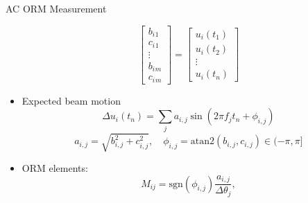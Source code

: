 \documentclass[aspectratio=169]{beamer}
\begin{document}
\begin{frame}{AC ORM Measurement}
\begin{minipage}{0.55\textwidth}
\begin{itemize}
\begin{equation*}
\begin{bmatrix}
                            b_{i}{}_{1}\\
                            c_{i}{}_{1}\\
                            \vdots \\
                            b_{i}{}_{m}\\
                            c_{i}{}_{m}
                        \end{bmatrix} =\begin{bmatrix}
                            u_{i}( t_{1})\\
                            u_{i}( t_{2})\\
                            \vdots \\
                            u_{i}( t_{n})
                        \end{bmatrix}
                \end{equation*}
            \item Expected beam motion $$\Delta u_i(t_n) = \sum_j a_{i,j}\sin(2\pi f_j t_n + \phi_{i,j})$$
                \begin{equation*}
                    a_{i,j}=\sqrt{b^2_{i,j}+c^2_{i,j}}, \quad \phi_{i,j}=\text{atan}2(b_{i,j},c_{i,j})\in(-\pi,\pi]
                \end{equation*}
            \item ORM elements:
                \begin{equation*}
                    M_{ij}=\text{sgn}(\phi_{i,j})\frac{a_{i,j}}{\Delta \theta_j},
                \end{equation*}
        \end{itemize}
    \end{minipage}
\end{frame}
\end{document}
